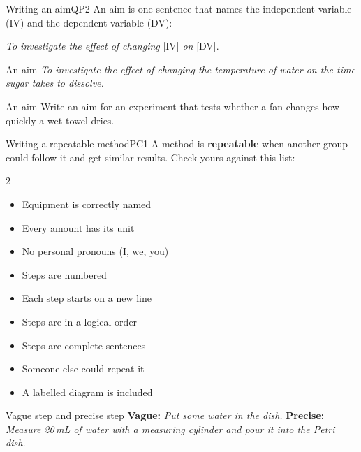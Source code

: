 
\begin{technique}{Writing an aim}{QP2}
An aim is one sentence that names the independent variable (IV) and the dependent variable (DV):
\begin{center}\emph{To investigate the effect of changing} [IV] \emph{on} [DV].\end{center}
\end{technique}

\begin{workedex}{An aim}
\emph{To investigate the effect of changing the temperature of water on the time sugar takes to dissolve.}
\end{workedex}

\begin{wedo}{An aim}
Write an aim for an experiment that tests whether a fan changes how quickly a wet towel dries.
\answerbox{3cm}
\end{wedo}

\begin{technique}{Writing a repeatable method}{PC1}
A method is \textbf{repeatable} when another group could follow it and get similar results. Check yours against this list:
\begin{multicols}{2}
\begin{itemize}[leftmargin=1.2em, itemsep=0pt, topsep=2pt]
  \item[\tickbox] Equipment is correctly named
  \item[\tickbox] Every amount has its unit
  \item[\tickbox] No personal pronouns (I, we, you)
  \item[\tickbox] Steps are numbered
  \item[\tickbox] Each step starts on a new line
  \item[\tickbox] Steps are in a logical order
  \item[\tickbox] Steps are complete sentences
  \item[\tickbox] Someone else could repeat it
  \item[\tickbox] A labelled diagram is included
\end{itemize}
\end{multicols}
\end{technique}

\begin{workedex}{Vague step and precise step}
\textbf{Vague:} \emph{Put some water in the dish.}\qquad
\textbf{Precise:} \emph{Measure 20\,mL of water with a measuring cylinder and pour it into the Petri dish.}
\end{workedex}

